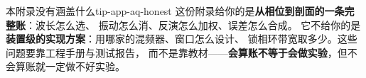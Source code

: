 \begin{tip}{本附录没有涵盖什么}{tip-app-aq-honest}
这份附录给你的是\textbf{从相位到剖面的一条完整账}：波长怎么选、
振动怎么消、反演怎么加权、误差怎么合成。
它不给你的是\textbf{装置级的实现方案}：用哪家的混频器、窗口怎么设计、
锁相环带宽取多少。这些问题要靠工程手册与测试报告，
而不是靠教材——\textbf{会算账不等于会做实验}，但不会算账就一定做不好实验。
\end{tip}
\endgroup
